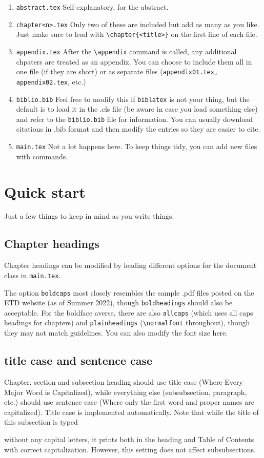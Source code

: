 \begin{enumerate}
\item \texttt{abstract.tex} Self-explanatory, for the abstract.
\item \texttt{chapter<n>.tex} Only two of these are included but add as many as you like. Just make sure to lead with \verb|\chapter{<title>}| on the first line of each file.
\item \texttt{appendix.tex} After the \verb|\appendix| command is called, any additional chpaters are treated as an appendix. You can choose to include them all in one file (if they are short) or as separate files (\texttt{appendix01.tex, appendix02.tex}, etc.)
\item \texttt{biblio.bib} Feel free to modify this if \texttt{biblatex} is not your thing, but the default is to load it in the .cls file (be aware in case you load something else) and refer to the \texttt{biblio.bib} file for information. You can usually download citations in .bib format and then modify the entries so they are easier to cite. 
\item \texttt{main.tex} Not a lot happens here. To keep things tidy, you can add new files with \verb|| commands.
\end{enumerate}

\section{Quick start}
Just a few things to keep in mind as you write things. 
\subsection{Chapter headings}
Chapter headings can be modified by loading different options for the document class in \texttt{main.tex}.



The option \texttt{boldcaps} most closely resembles the sample .pdf files posted on the ETD website (as of Summer 2022), though \texttt{boldheadings} should also be acceptable. For the boldface averse, there are also \texttt{allcaps} (which uses all caps headings for chapters) and \texttt{plainheadings} (\verb|\normalfont| throughout), though they may not match guidelines. You can also modify the font size here. 

\subsection{title case and sentence case}
Chapter, section and subsection heading should use title case (Where Every Major Word is Capitalized), while everything else (subsubsection, paragraph, etc.) should use sentence case (Where only the first word and proper names are capitalized). Title case is implemented automatically. Note that while the title of this subsection is typed

without any capital letters, it prints both in the heading and Table of Contents with correct capitalization. However, this setting does not affect subsubsections.

